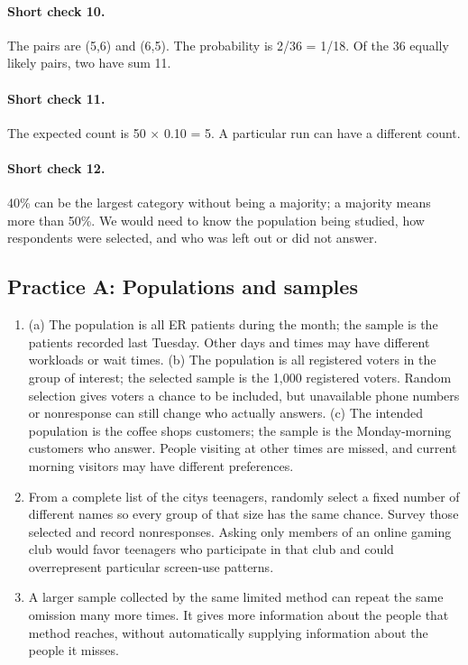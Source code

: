 \documentclass[12pt,letterpaper]{article}
\begin{document}
\paragraph{Short check 10.}
The pairs are (5,6) and (6,5). The probability is 2/36 = 1/18. Of the 36 equally likely pairs, two have sum 11.


\paragraph{Short check 11.}
The expected count is 50 $\times$ 0.10 = 5. A particular run can have a different count.


\paragraph{Short check 12.}
40\% can be the largest category without being a majority; a majority means more than 50\%. We would need to know the population being studied, how respondents were selected, and who was left out or did not answer.


\clearpage

\subsection*{Practice A: Populations and samples}
\begin{enumerate}[label=A\arabic*.,leftmargin=2.5em,itemsep=10pt]
\item (a) The population is all ER patients during the month; the sample is the patients recorded last Tuesday. Other days and times may have different workloads or wait times. (b) The population is all registered voters in the group of interest; the selected sample is the 1,000 registered voters. Random selection gives voters a chance to be included, but unavailable phone numbers or nonresponse can still change who actually answers. (c) The intended population is the coffee shop\textquotesingle s customers; the sample is the Monday-morning customers who answer. People visiting at other times are missed, and current morning visitors may have different preferences.
\item From a complete list of the city\textquotesingle s teenagers, randomly select a fixed number of different names so every group of that size has the same chance. Survey those selected and record nonresponses. Asking only members of an online gaming club would favor teenagers who participate in that club and could overrepresent particular screen-use patterns.
\item A larger sample collected by the same limited method can repeat the same omission many more times. It gives more information about the people that method reaches, without automatically supplying information about the people it misses.
\end{enumerate}
\end{document}
